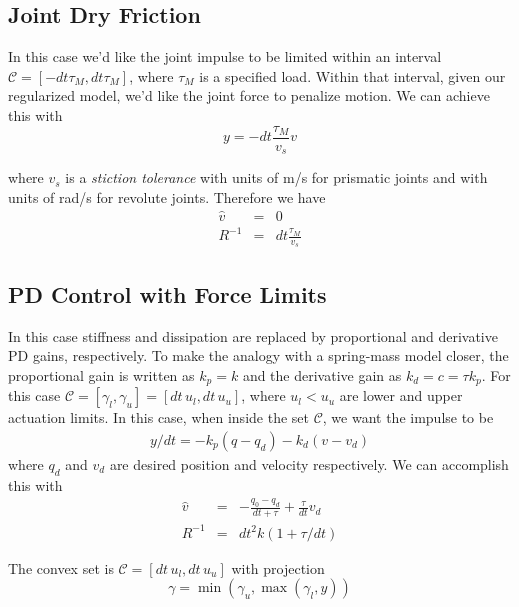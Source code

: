 \subsection{Joint Dry Friction}

In this case we'd like the joint impulse to be limited within an interval
$\mathcal{C} = [-dt\tau_M, dt\tau_M]$, where $\tau_M$ is a specified load.
Within that interval, given our regularized model, we'd like the joint force to
penalize motion. We can achieve this with
\begin{equation}
	y = -dt\frac{\tau_M}{v_s}v
\end{equation}

where $v_s$ is a \textit{stiction tolerance} with units of m/s for prismatic
joints and with units of rad/s for revolute joints. Therefore we have
\begin{eqnarray}
	\hat{v} &=& 0\nonumber\\
	R^{-1} &=& dt\frac{\tau_M}{v_s}
\end{eqnarray}

\subsection{PD Control with Force Limits}
In this case stiffness and dissipation are replaced by proportional and
derivative PD gains, respectively. To make the analogy with a spring-mass model
closer, the proportional gain is written as $k_p = k$ and the derivative gain as
$k_d = c = \tau k_p$. For this case $\mathcal{C} = [\gamma_l, \gamma_u] =
[dt\,u_l, dt\,u_u]$, where $u_l < u_u$ are lower and upper actuation limits.  In
this case, when inside the set $\mathcal{C}$, we want the impulse to be
\begin{eqnarray}
	y/dt = -k_p(q-q_d)-k_d(v-v_d)
\end{eqnarray}
where $q_d$ and $v_d$ are desired position and velocity respectively. We can
accomplish this with
\begin{eqnarray}
	\hat{v} &=& -\frac{q_0-q_d}{dt+\tau}+\frac{\tau}{dt}v_d\nonumber\\
	R^{-1}  &=& dt^2k(1+\tau/dt)
\end{eqnarray}

The convex set is $\mathcal{C} = [dt\,u_l, dt\,u_u]$ with projection
\begin{equation}
	\gamma = \min(\gamma_u, \max(\gamma_l, y))
\end{equation}


